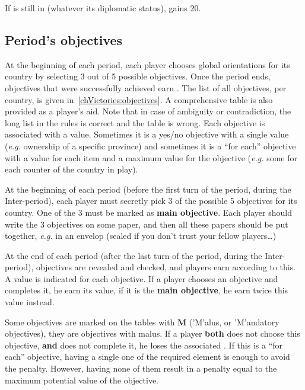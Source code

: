 \aparag[Special]
\bparag If \paysChevaliers is still in \provinceRhodos (whatever its
diplomatic status), \HIS gains 20\VPs.

\subsection{Period's objectives}
\aparag[Overview]
\bparag At the beginning of each period, each player chooses global
orientations for its country by selecting 3 out of 5 possible objectives.
\bparag Once the period ends, objectives that were successfully achieved earn
\VPs.
\bparag The list of all objectives, per country, is given
in~\ref{chVictories:objectives}. A comprehensive table is also provided as a
player's aid. Note that in case of ambiguity or contradiction, the long list
in the rules is correct and the table is wrong.
\bparag Each objective is associated with a \VPs value. Sometimes it is a
yes/no objective with a single value (\emph{e.g.} ownership of a specific
province) and sometimes it is a ``for each'' objective with a value for each
item and a maximum value for the objective (\emph{e.g.} some \VPs for each
\TradeFLEET counter of the country in play).

\bparag At the beginning of each period (before the first turn of the period,
during the Inter-period), each player must secretly pick 3 of the possible 5
objectives for its country.
\bparag One of the 3 must be marked as \textbf{main objective}.
\bparag Each player should write the 3 objectives on some paper, and then all
these papers should be put together, \emph{e.g.} in an envelop (sealed if you
don't trust your fellow players\ldots)

\bparag At the end of each period (after the last turn of the period, during
the Inter-period), objectives are revealed and checked, and players earn \VPs
according to this.
\bparag A \VP value is indicated for each objective. If a player chooses
an objective and completes it, he earn its \VP value, if it is the
\textbf{main objective}, he earn twice this value instead.

\bparag Some objectives are marked on the tables with {\bf M} ('M'alus, or
'M'andatory objectives), they are objectives with malus.
\bparag If a player \textbf{both} does not choose this objective, \textbf{and}
does not complete it, he loses the associated \VPs.
\bparag If this is a ``for each'' objective, having a single one of the
required element is enough to avoid the penalty. However, having none of them
result in a penalty equal to the maximum potential value of the objective.

